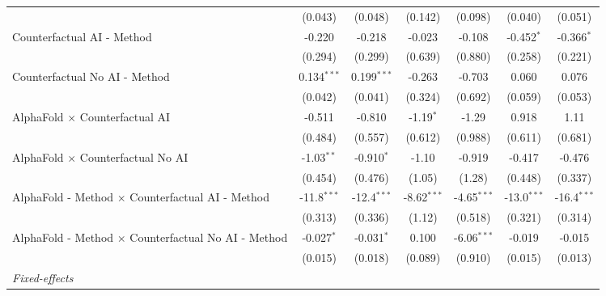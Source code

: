 \begin{tabular}{lcccccc}
                                                              & (0.043)       & (0.048)       & (0.142)       & (0.098)       & (0.040)        & (0.051)\\   
   Counterfactual AI - Method                                 & -0.220        & -0.218        & -0.023        & -0.108        & -0.452$^{*}$   & -0.366$^{*}$\\   
                                                              & (0.294)       & (0.299)       & (0.639)       & (0.880)       & (0.258)        & (0.221)\\   
   Counterfactual No AI - Method                              & 0.134$^{***}$ & 0.199$^{***}$ & -0.263        & -0.703        & 0.060          & 0.076\\   
                                                              & (0.042)       & (0.041)       & (0.324)       & (0.692)       & (0.059)        & (0.053)\\   
   AlphaFold $\times$ Counterfactual AI                       & -0.511        & -0.810        & -1.19$^{*}$   & -1.29         & 0.918          & 1.11\\   
                                                              & (0.484)       & (0.557)       & (0.612)       & (0.988)       & (0.611)        & (0.681)\\   
   AlphaFold $\times$ Counterfactual No AI                    & -1.03$^{**}$  & -0.910$^{*}$  & -1.10         & -0.919        & -0.417         & -0.476\\   
                                                              & (0.454)       & (0.476)       & (1.05)        & (1.28)        & (0.448)        & (0.337)\\   
   AlphaFold - Method $\times$ Counterfactual AI - Method     & -11.8$^{***}$ & -12.4$^{***}$ & -8.62$^{***}$ & -4.65$^{***}$ & -13.0$^{***}$  & -16.4$^{***}$\\   
                                                              & (0.313)       & (0.336)       & (1.12)        & (0.518)       & (0.321)        & (0.314)\\   
   AlphaFold - Method $\times$ Counterfactual No AI - Method  & -0.027$^{*}$  & -0.031$^{*}$  & 0.100         & -6.06$^{***}$ & -0.019         & -0.015\\   
                                                              & (0.015)       & (0.018)       & (0.089)       & (0.910)       & (0.015)        & (0.013)\\   
   \midrule
   \emph{Fixed-effects}\\

\end{tabular}
